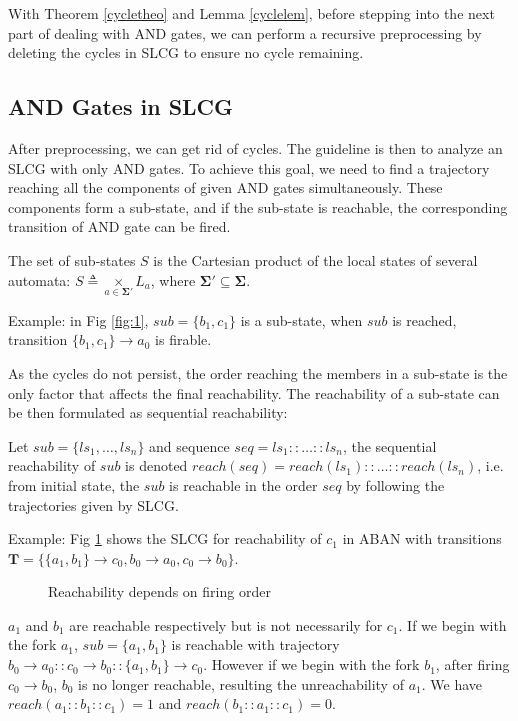 \documentclass[runningheads]{llncs}
\newcommand{\acm}[3]{#1\rightarrow#2}
\newcommand{\ac}[3]{$#1\rightarrow#2$}
\begin{document}
With Theorem \ref{cycletheo} and Lemma \ref{cyclelem}, before stepping into the next part of dealing with AND gates, we can perform a recursive preprocessing by deleting the cycles in SLCG to ensure no cycle remaining.
\subsection{AND Gates in SLCG}\label{sectAndGates}
After preprocessing, we can get rid of cycles. The guideline is then to analyze an SLCG with only AND gates. To achieve this goal, we need to find a trajectory reaching all the components of given AND gates simultaneously. These components form a sub-state, and if the sub-state is reachable, the corresponding transition of AND gate can be fired. 
\begin{definition}
The set of sub-states $S$ is the Cartesian product of the local states of several automata: $S\triangleq \underset{a\in \mathbf{\Sigma}'}{\times} L_a$, where $\mathbf{\Sigma}'\subseteq \mathbf{\Sigma}$.
\end{definition}

Example: in Fig \ref{fig:1}, $sub=\{ b_1,c_1\}$ is a sub-state, when $sub$ is reached, transition \ac{\{ b_1,c_1\}}{a_0}{a_1} is firable.

As the cycles do not persist, the order reaching the members in a sub-state is the only factor that affects the final reachability. The reachability of a sub-state can be then formulated as sequential reachability:
\begin{definition}
Let $sub=\{ls_1,\ldots,ls_n\}$ and sequence $seq=ls_1::\ldots::ls_n$, the sequential reachability of $sub$ is denoted $reach (seq)=reach (ls_1)::\ldots::reach (ls_n)$, i.e. from initial state, the $sub$ is reachable in the order $seq$ by following the trajectories given by SLCG.
\end{definition}

Example: Fig \ref{fig:5} shows the SLCG for reachability of $c_1$ in ABAN with transitions $\mathbf{T}=\{\acm{\{a_1,b_1\}}{c_0}{c_1},\acm{b_0}{a_0}{a_1},\acm{c_0}{b_0}{b_1}\}$.
\begin{figure}[ht]
\centering

\caption{Reachability depends on firing order}
\label{fig:5}
\end{figure}

$a_1$ and $b_1$ are reachable respectively but is not necessarily for $c_1$. If we begin with the fork $a_1$, $sub=\{a_1,b_1\}$ is reachable with trajectory $\acm{b_0}{a_0}{a_1}::\acm{c_0}{b_0}{b_1}::\acm{\{a_1,b_1\}}{c_0}{c_1}$. However if we begin with the fork $b_1$, after firing $\acm{c_0}{b_0}{b_1}$, $b_0$ is no longer reachable, resulting the unreachability of $a_1$. We have $reach (a_1::b_1::c_1)=1$ and $reach (b_1::a_1::c_1)=0$.
\end{document}
